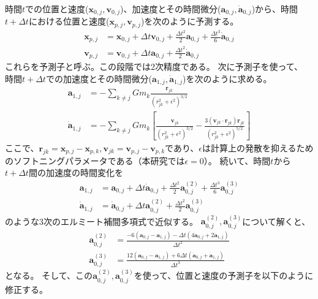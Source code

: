 \documentclass[a4paper,10pt,oneside,twocolumn,notitlepage,final]{jarticle}
\begin{document}
時間$t$での位置と速度(${\bm x}_{0,j},{\bm v}_{0,j}$)、加速度とその時間微分(${\bm a}_{0,j},\dot{{\bm a}}_{0,j}$)から、時間$t + \Delta t$における位置と速度(${\bm x}_{p,j} , {\bm v}_{p,j}$)を次のように予測する。
\begin{align}
{\bm x}_{p,j} &= {\bm x}_{0,j} + \Delta t {\bm v}_{0,j} + \frac{\Delta t ^2}{2} {\bm a}_{0,j} + \frac{\Delta t ^3}{6} \dot{{\bm a}}_{0,j}\\
{\bm v}_{p,j} &= {\bm v}_{0,j} + \Delta t {\bm a}_{0,j} + \frac{\Delta t ^2}{2} \dot{{\bm a}}_{0,j}
\end{align}
これらを予測子と呼ぶ。この段階では2次精度である。
次に予測子を使って、 時間$t + \Delta t$での加速度とその時間微分(${\bm a}_{1,j},\dot{{\bm a}}_{1,j}$)を次のように求める。
\begin{align}
{\bm a}_{1,j} &= - \sum_{k \not= j} G m_k \frac{{\bm r}_{jk}}{(r_{jk}^2 + \epsilon^2)^{3/2}}\label{eq:a1j}\\
\dot{{\bm a}}_{1,j} &= - \sum_{k \not= j} G m_k \left[ \frac{{\bm v}_{jk}}{(r_{jk}^2 + \epsilon^2)^{3/2}} - \frac{3 ( {\bm v}_{jk} \cdot {\bm r}_{jk} ) {\bm r}_{jk} }{(r_{jk}^2 + \epsilon^2)^{5/2}} \right]\label{eq:adot1j}
\end{align}
ここで、${\bm r}_{jk} = {\bm x}_{p,j} - {\bm x}_{p,k},{\bm v}_{jk} = {\bm v}_{p,j} - {\bm v}_{p,k}$であり、$\epsilon$は計算上の発散を抑えるためのソフトニングパラメータである（本研究では$\epsilon=0$）。
続いて、時間$t$から$t+\Delta t$間の加速度の時間変化を
\begin{align}
{\bm a}_{1,j} &= {\bm a}_{0,j} + \Delta t \dot{{\bm a}}_{0,j} + \frac{\Delta t ^2}{2} {\bm a}_{0,j}^{(2)} + \frac{\Delta t ^3}{6} {\bm a}_{0,j}^{(3)}\\
\dot{{\bm a}}_{1,j} &= \dot{{\bm a}}_{0,j} + \Delta t {\bm a}_{0,j}^{(2)} + \frac{\Delta t ^2}{2} {\bm a}_{0,j}^{(3)}
\end{align}
のような3次のエルミート補間多項式で近似する。
${\bm a}_{0,j}^{(2)},{\bm a}_{0,j}^{(3)}$について解くと、
\begin{align}
{\bm a}_{0,j}^{(2)} &= \frac{- 6 ({\bm a}_{0,j} - {\bm a}_{1,j}) - \Delta t (4 \dot{{\bm a}}_{0,j} + 2 \dot{{\bm a}}_{1,j})}{\Delta t ^2}\\
{\bm a}_{0,j}^{(3)} &= \frac{12 ({\bm a}_{0,j} - {\bm a}_{1,j}) + 6 \Delta t (\dot{{\bm a}}_{0,j} + \dot{{\bm a}}_{1,j})}{\Delta t ^3}
\end{align}
となる。
そして、この${\bm a}_{0,j}^{(2)},{\bm a}_{0,j}^{(3)}$を使って、位置と速度の予測子を以下のように修正する。
\end{document}
